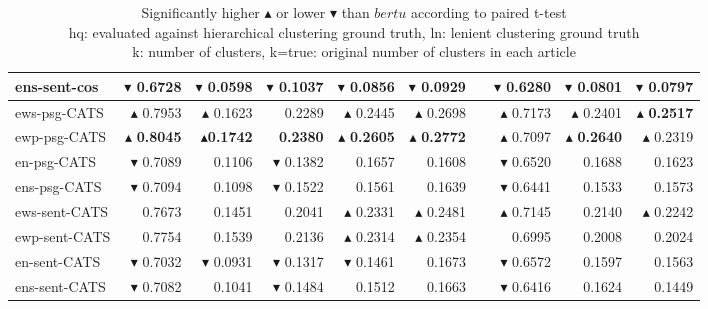 \begin{table}[t]
\begin{tabular}{@{}lrrrrrrrrr@{}}
ens-sent-cos & $\blacktriangledown$ 0.6728 & $\blacktriangledown$ 0.0598 & $\blacktriangledown$ 0.1037 & $\blacktriangledown$ 0.0856 & $\blacktriangledown$ 0.0929 && $\blacktriangledown$ 0.6280 & $\blacktriangledown$ 0.0801 & $\blacktriangledown$ 0.0797 \\\midrule
ews-psg-CATS & $\blacktriangle$ 0.7953 & $\blacktriangle$ 0.1623 & 0.2289 & $\blacktriangle$ 0.2445 & $\blacktriangle$ 0.2698 && $\blacktriangle$ 0.7173 & $\blacktriangle$ 0.2401 & $\blacktriangle$ \textbf{0.2517} \\ 
ewp-psg-CATS & $\blacktriangle$ \textbf{0.8045} & $\blacktriangle$\textbf{0.1742} & \textbf{0.2380} & $\blacktriangle$ \textbf{0.2605} & $\blacktriangle$ \textbf{0.2772} && $\blacktriangle$ 0.7097 & $\blacktriangle$ \textbf{0.2640} & $\blacktriangle$ 0.2319 \\ 
en-psg-CATS & $\blacktriangledown$ 0.7089 & 0.1106 & $\blacktriangledown$ 0.1382 & 0.1657 & 0.1608 && $\blacktriangledown$ 0.6520 & 0.1688 & 0.1623 \\ 
ens-psg-CATS & $\blacktriangledown$ 0.7094 & 0.1098 & $\blacktriangledown$ 0.1522 & 0.1561 & 0.1639 && $\blacktriangledown$ 0.6441 & 0.1533 & 0.1573 \\\midrule
ews-sent-CATS & 0.7673 & 0.1451 & 0.2041 & $\blacktriangle$ 0.2331 & $\blacktriangle$ 0.2481 && $\blacktriangle$ 0.7145 & 0.2140 & $\blacktriangle$ 0.2242 \\ 
ewp-sent-CATS & 0.7754 & 0.1539 & 0.2136 & $\blacktriangle$ 0.2314 & $\blacktriangle$ 0.2354 && 0.6995 & 0.2008 & 0.2024 \\ 
en-sent-CATS & $\blacktriangledown$ 0.7032 & $\blacktriangledown$ 0.0931 & $\blacktriangledown$ 0.1317 & $\blacktriangledown$ 0.1461 & 0.1673 && $\blacktriangledown$ 0.6572 & 0.1597 & 0.1563 \\ 
ens-sent-CATS & $\blacktriangledown$ 0.7082 & 0.1041 & $\blacktriangledown$ 0.1484 & 0.1512 & 0.1663 && $\blacktriangledown$ 0.6416 & 0.1624 & 0.1449 \\ 
\bottomrule
\end{tabular}
\caption*{Significantly higher $\blacktriangle$ or lower $\blacktriangledown$ than $bertu$ according to paired t-test \\
hq: evaluated against hierarchical clustering ground truth, ln: lenient clustering ground truth\\
k: number of clusters, k=true: original number of clusters in each article}
\end{table}

